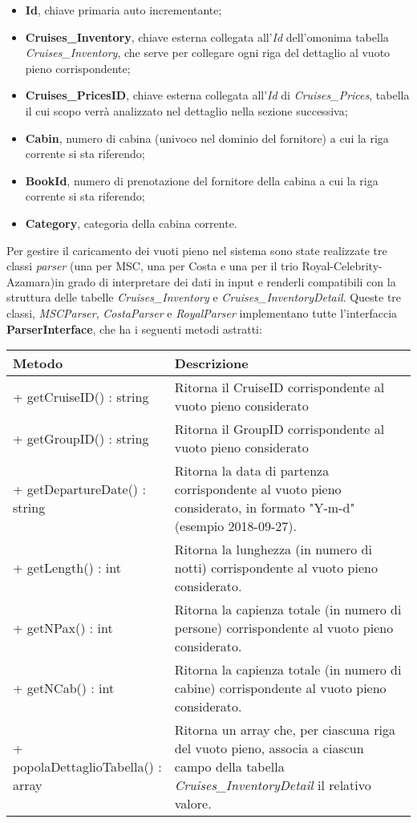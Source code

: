 \begin{itemize}
	\item \textbf{Id}, chiave primaria auto incrementante;
	\item \textbf{Cruises\_Inventory}, chiave esterna collegata all'\textit{Id} dell'omonima tabella \textit{Cruises\_Inventory}, che serve per collegare ogni riga del dettaglio al vuoto pieno corrispondente;
	\item \textbf{Cruises\_PricesID}, chiave esterna collegata all'\textit{Id} di \textit{Cruises\_Prices}, tabella il cui scopo verrà analizzato nel dettaglio nella sezione successiva;
	\item \textbf{Cabin}, numero di cabina (univoco nel dominio del fornitore) a cui la riga corrente si sta riferendo;
	\item \textbf{BookId}, numero di prenotazione del fornitore della cabina a cui la riga corrente si sta riferendo;
	\item \textbf{Category}, categoria della cabina corrente.
\end{itemize}
Per gestire il caricamento dei vuoti pieno nel sistema sono state realizzate tre classi \textit{parser} (una per MSC, una per Costa e una per il trio Royal-Celebrity-Azamara)in grado di interpretare dei dati in input e renderli compatibili con la struttura delle tabelle \textit{Cruises\_Inventory} e \textit{Cruises\_InventoryDetail}. Queste tre classi, \textit{MSCParser}, \textit{CostaParser} e \textit{RoyalParser} implementano tutte l'interfaccia \textbf{ParserInterface}, che ha i seguenti metodi astratti:
\begin{center}
	\def\arraystretch{1.5}
	\begin{tabularx}{\columnwidth}{XX}
		\hline
		\textbf{Metodo} & \textbf{Descrizione} \\ \hline
		+ getCruiseID() : string & Ritorna il CruiseID corrispondente al vuoto pieno considerato\\
		\hline
		+ getGroupID() : string & Ritorna il GroupID corrispondente al vuoto pieno considerato\\
		\hline
		+ getDepartureDate() : string & Ritorna la data di partenza corrispondente al vuoto pieno considerato, in formato "Y-m-d" (esempio 2018-09-27).\\
		\hline
		+ getLength() : int & Ritorna la lunghezza (in numero di notti) corrispondente al vuoto pieno considerato.\\
		\hline
		+ getNPax() : int & Ritorna la capienza totale (in numero di persone) corrispondente al vuoto pieno considerato.\\
		\hline
		+ getNCab() : int & Ritorna la capienza totale (in numero di cabine) corrispondente al vuoto pieno considerato.\\
		\hline
		+ popolaDettaglioTabella() : array & Ritorna un array che, per ciascuna riga del vuoto pieno, associa a ciascun campo della tabella \textit{Cruises\_InventoryDetail} il relativo valore.\\
		\hline
	\end{tabularx}
\end{center}
